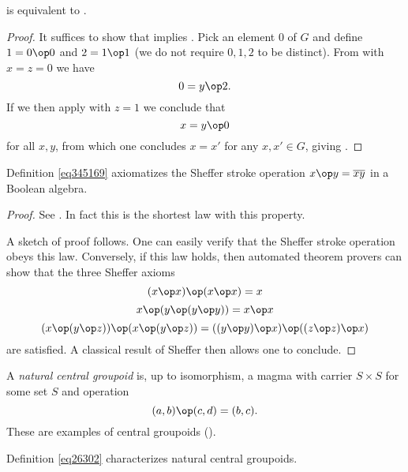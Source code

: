 \begin{theorem}[953 is equivalent to 2]\label{953_equiv_2}\leanok  {} is equivalent to .
\end{theorem}

\begin{proof}\leanok  It suffices to show that  implies .  Pick an element $0$ of $G$ and define $1 = 0 \op 0$ and $2 = 1 \op 1$ (we do not require $0,1,2$ to be distinct).
From  with $x=z=0$ we have
$$ 0 = y \op 2.$$
If we then apply  with $z=1$ we conclude that
$$ x = y \op 0$$
for all $x,y$, from which one concludes $x=x'$ for any $x,x' \in G$, giving .
\end{proof}


\begin{theorem}\label{sheffer}\leanok  Definition \ref{eq345169}
axiomatizes the Sheffer stroke operation $x \op y = \overline{xy}$ in a Boolean algebra.
\end{theorem}

\begin{proof}\leanok
See \cite{mccune_et_al}.  In fact this is the shortest law with this property.

A sketch of proof follows.  One can easily verify that the Sheffer stroke operation obeys this law.  Conversely, if this law holds, then automated theorem provers can show that the three Sheffer axioms
$$ (x \op x) \op (x \op x)  = x$$
$$ x \op (y \op (y \op y)) = x \op x$$
$$ (x \op (y \op z)) \op (x \op (y \op z)) = ((y \op y) \op x) \op ((z \op z) \op x)$$
are satisfied.  A classical result of Sheffer \cite{sheffer} then allows one to conclude.
\end{proof}

A \emph{natural central groupoid} is, up to isomorphism, a magma with carrier $S \times S$ for some set $S$ and operation
$$ (a,b) \op (c,d) = (b,c).$$
These are examples of central groupoids ().

\begin{theorem}\label{natural-central-groupoid}  Definition \ref{eq26302} characterizes natural central groupoids.
\end{theorem}

